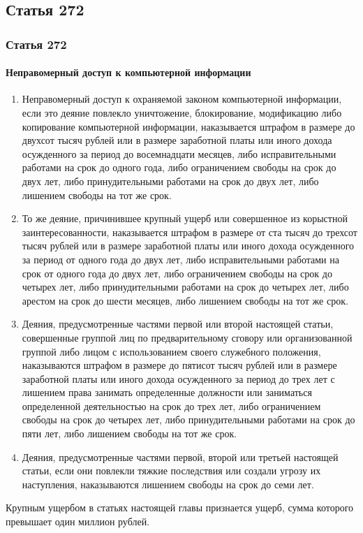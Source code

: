  
\subsection{Статья 272}

\begin{frame}[allowframebreaks]
    \frametitle{Статья 272}
    \framesubtitle{Неправомерный доступ к компьютерной информации}
    \begin{enumerate}
        \item Неправомерный доступ к охраняемой законом компьютерной информации, если это деяние повлекло уничтожение, блокирование, модификацию либо копирование компьютерной информации, наказывается штрафом в размере до двухсот тысяч рублей или в размере заработной платы или иного дохода осужденного за период до восемнадцати месяцев, либо исправительными работами на срок до одного года, либо ограничением свободы на срок до двух лет, либо принудительными работами на срок до двух лет, либо лишением свободы на тот же срок.
        
        \item То же деяние, причинившее крупный ущерб или совершенное из корыстной заинтересованности, наказывается штрафом в размере от ста тысяч до трехсот тысяч рублей или в размере заработной платы или иного дохода осужденного за период от одного года до двух лет, либо исправительными работами на срок от одного года до двух лет, либо ограничением свободы на срок до четырех лет, либо принудительными работами на срок до четырех лет, либо арестом на срок до шести месяцев, либо лишением свободы на тот же срок.
        
        \item Деяния, предусмотренные частями первой или второй настоящей статьи, совершенные группой лиц по предварительному сговору или организованной группой либо лицом с использованием своего служебного положения, наказываются штрафом в размере до пятисот тысяч рублей или в размере заработной платы или иного дохода осужденного за период до трех лет с лишением права занимать определенные должности или заниматься определенной деятельностью на срок до трех лет, либо ограничением свободы на срок до четырех лет, либо принудительными работами на срок до пяти лет, либо лишением свободы на тот же срок.
        
        \item Деяния, предусмотренные частями первой, второй или третьей настоящей статьи, если они повлекли тяжкие последствия или создали угрозу их наступления, наказываются лишением свободы на срок до семи лет.
    \end{enumerate}
    Крупным ущербом в статьях настоящей главы признается ущерб, сумма которого превышает один миллион рублей.
\end{frame}
 

